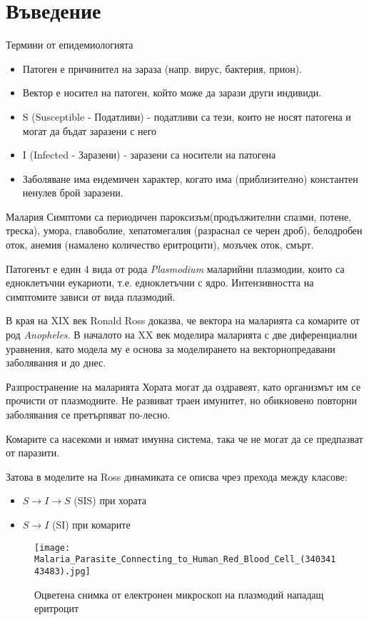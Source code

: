 \section{\hspace{1em}Въведение}

\begin{frame}[t]{Термини от епидемиологията}
  \begin{itemize}
    \item Патоген е причинител на зараза (напр. вирус, бактерия, прион).
    \item Вектор е носител на патоген, който може да зарази други индивиди.
    \item S (Susceptible - Податливи) - податливи са тези, които не носят патогена и могат да бъдат заразени с него
    \item I (Infected - Заразени) - заразени са носители на патогена
    \item Заболяване има ендемичен характер, когато има (приблизително) константен ненулев брой заразени.
  \end{itemize}
\end{frame}

\begin{frame}[t]{Малария}
  Симптоми са периодичен пароксизъм(продължителни спазми, потене, треска), умора, главоболие, хепатомегалия (разраснал се черен дроб), белодробен оток, анемия (намалено количество еритроцити), мозъчек оток, смърт.

  Патогенът е един 4 вида от рода \textit{Plasmodium} маларийни плазмодии, които са едноклетъчни еукариоти, т.е. едноклетъчни с ядро. Интензивността на симптомите зависи от вида плазмодий.

  В края на XIX век Ronald Ross доказва, че вектора на маларията са комарите от род \textit{Anopheles}.
  В началото на XX век моделира маларията с две диференциални уравнения, като модела му е основа за моделирането на векторнопредавани заболявания и до днес.
\end{frame}

\begin{frame}[t]{Разпространение на маларията}
  Хората могат да оздравеят, като организмът им се прочисти от плазмодиите.
  Не развиват траен имунитет, но обикновено повторни заболявания се претърпяват по-лесно.

  Комарите са насекоми и нямат имунна система, така че не могат да се предпазват от паразити.

  Затова в моделите на Ross динамиката се описва чрез прехода между класове:
  \begin{itemize}
    \item $S \rightarrow I \rightarrow S$ (SIS) при хората
    \item $S \rightarrow I$ (SI) при комарите
  \end{itemize}

  \begin{figure}
    \texttt{[image: Malaria\_Parasite\_Connecting\_to\_Human\_Red\_Blood\_Cell\_(34034143483).jpg]}
    \centering
    \caption{Оцветена снимка от електронен микроскоп на плазмодий нападащ еритроцит}
  \end{figure}
\end{frame}
